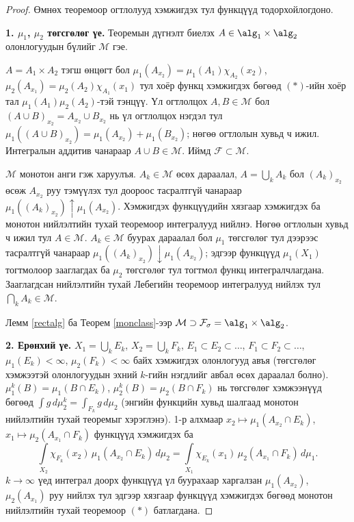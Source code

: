 \begin{proof}
Өмнөх теоремоор огтлолууд хэмжигдэх тул функцүүд тодорхойлогдоно.

\textbf{1. $\mu_1$, $\mu_2$ төгсгөлөг үе.} Теоремын дүгнэлт биелэх $A\in\alg_1\times\alg_2$ олонлогуудын бүлийг $\mathcal{M}$ гэе.

$A=A_1\times A_2$ тэгш өнцөгт бол $\mu_1(A_{x_2})=\mu_1(A_1)\chi_{A_2}(x_2)$, $\mu_2(A_{x_1})=\mu_2(A_2)\chi_{A_1}(x_1)$ тул хоёр функц хэмжигдэх бөгөөд $(*)$-ийн хоёр тал $\mu_1(A_1)\mu_2(A_2)$-тэй тэнцүү. Үл огтлолцох $A,B\in\mathcal{M}$ бол $(A\cup B)_{x_2}=A_{x_2}\cup B_{x_2}$ нь үл огтлолцох нэгдэл тул $\mu_1((A\cup B)_{x_2})=\mu_1(A_{x_2})+\mu_1(B_{x_2})$; нөгөө огтлолын хувьд ч ижил. Интегралын аддитив чанараар $A\cup B\in\mathcal{M}$. Иймд $\mathcal{F}\subset\mathcal{M}$.

$\mathcal{M}$ монотон анги гэж харуулъя. $A_k\in\mathcal{M}$ өсөх дараалал, $A=\bigcup_kA_k$ бол $(A_k)_{x_2}$ өсөж $A_{x_2}$ руу тэмүүлэх тул доороос тасралтгүй чанараар $\mu_1((A_k)_{x_2})\uparrow\mu_1(A_{x_2})$. Хэмжигдэх функцүүдийн хязгаар хэмжигдэх ба монотон нийлэлтийн тухай теоремоор интегралууд нийлнэ. Нөгөө огтлолын хувьд ч ижил тул $A\in\mathcal{M}$. $A_k\in\mathcal{M}$ буурах дараалал бол $\mu_1$ төгсгөлөг тул дээрээс тасралтгүй чанараар $\mu_1((A_k)_{x_2})\downarrow\mu_1(A_{x_2})$; эдгээр функцүүд $\mu_1(X_1)$ тогтмолоор зааглагдах ба $\mu_2$ төгсгөлөг тул тогтмол функц интегралчлагдана. Зааглагдсан нийлэлтийн тухай Лебегийн теоремоор интегралууд нийлэх тул $\bigcap_kA_k\in\mathcal{M}$.

Лемм \ref{rectalg} ба Теорем \ref{monclass}-ээр $\mathcal{M}\supset\mathcal{F}_{\sigma}=\alg_1\times\alg_2$.

\textbf{2. Ерөнхий үе.} $X_1=\bigcup_kE_k$, $X_2=\bigcup_kF_k$, $E_1\subset E_2\subset\ldots$, $F_1\subset F_2\subset\ldots$, $\mu_1(E_k)<\infty$, $\mu_2(F_k)<\infty$ байх хэмжигдэх олонлогууд авъя (төгсгөлөг хэмжээтэй олонлогуудын эхний $k$-гийн нэгдлийг авбал өсөх дараалал болно). $\mu_1^k(B)=\mu_1(B\cap E_k)$, $\mu_2^k(B)=\mu_2(B\cap F_k)$ нь төгсгөлөг хэмжээнүүд бөгөөд $\int g\,d\mu_2^k=\int_{F_k}g\,d\mu_2$ (энгийн функцийн хувьд шалгаад монотон нийлэлтийн тухай теоремыг хэрэглэнэ). 1-р алхмаар $x_2\mapsto\mu_1(A_{x_2}\cap E_k)$, $x_1\mapsto\mu_2(A_{x_1}\cap F_k)$ функцүүд хэмжигдэх ба
$$\int\limits_{X_2}\chi_{F_k}(x_2)\,\mu_1(A_{x_2}\cap E_k)\,d\mu_2=\int\limits_{X_1}\chi_{E_k}(x_1)\,\mu_2(A_{x_1}\cap F_k)\,d\mu_1.$$
$k\to\infty$ үед интеграл доорх функцүүд үл буурахаар харгалзан $\mu_1(A_{x_2})$, $\mu_2(A_{x_1})$ руу нийлэх тул эдгээр хязгаар функцүүд хэмжигдэх бөгөөд монотон нийлэлтийн тухай теоремоор $(*)$ батлагдана.
\end{proof}
